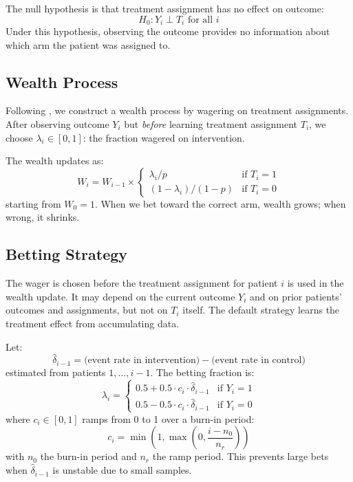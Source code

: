 \documentclass[10pt]{article}
\begin{document}
The null hypothesis is that treatment assignment has no effect on outcome:
\begin{equation}
H_0: Y_i \perp T_i \text{ for all } i
\end{equation}
Under this hypothesis, observing the outcome provides no information about which arm the patient was assigned to.

\subsection{Wealth Process}

Following \citet{pmlr-v177-duan22a}, we construct a wealth process by wagering on treatment assignments. After observing outcome $Y_i$ but \emph{before} learning treatment assignment $T_i$, we choose $\lambda_i \in [0, 1]$: the fraction wagered on intervention.

The wealth updates as:
\begin{equation}
W_i = W_{i-1} \times
\begin{cases}
\lambda_i / p & \text{if } T_i = 1 \\
(1 - \lambda_i) / (1-p) & \text{if } T_i = 0
\end{cases}
\end{equation}
starting from $W_0 = 1$. When we bet toward the correct arm, wealth grows; when wrong, it shrinks.

\subsection{Betting Strategy}

The wager is chosen before the treatment assignment for patient $i$ is used in the wealth update. It may depend on the current outcome $Y_i$ and on prior patients' outcomes and assignments, but not on $T_i$ itself. The default strategy learns the treatment effect from accumulating data.

Let:
\begin{equation}
\hat{\delta}_{i-1} = \text{(event rate in intervention)} - \text{(event rate in control)}
\end{equation}
estimated from patients $1, \ldots, i-1$. The betting fraction is:
\begin{equation}
\lambda_i =
\begin{cases}
0.5 + 0.5 \cdot c_i \cdot \hat{\delta}_{i-1} & \text{if } Y_i = 1 \\
0.5 - 0.5 \cdot c_i \cdot \hat{\delta}_{i-1} & \text{if } Y_i = 0
\end{cases}
\end{equation}
where $c_i \in [0, 1]$ ramps from 0 to 1 over a burn-in period:
\begin{equation}
c_i = \min\left(1, \max\left(0, \frac{i - n_0}{n_r}\right)\right)
\end{equation}
with $n_0$ the burn-in period and $n_r$ the ramp period. This prevents large bets when $\hat{\delta}_{i-1}$ is unstable due to small samples.
\end{document}
